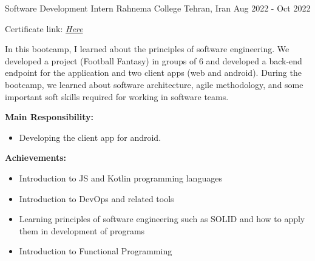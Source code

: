 \begin{cventries}
  \cventry
  {Software Development Intern} %
  {Rahnema College} %
  {Tehran, Iran} %
  {Aug 2022 - Oct 2022} %
  {
    \begin{cvitems} %
      \item {Certificate link: \href{https://rahnemacollege.com/certificate/mbroughani81ATzvlhQDHBAV_Q}
        {\textit{Here}}}
      \item {In this bootcamp, I learned about the principles of software engineering. We developed a project (Football Fantasy) in groups of 6 and developed a back-end endpoint for the application and two client apps (web and android). During the bootcamp, we learned about software architecture, agile methodology, and some important soft skills required for working in software teams.}
      \item {\textbf{Main Responsibility:}
                \begin{itemize}[label=-]
                    \item Developing the client app for android.
                \end{itemize}
            }
      \item {\textbf{Achievements:}
            \begin{itemize}[label=-]
                \item Introduction to JS and Kotlin programming languages
                \item Introduction to DevOps and related tools
                \item Learning principles of software engineering such as SOLID and how to apply them in development of programs
                \item Introduction to Functional Programming
            \end{itemize}
            }
    \end{cvitems}
  }


\end{cventries}
